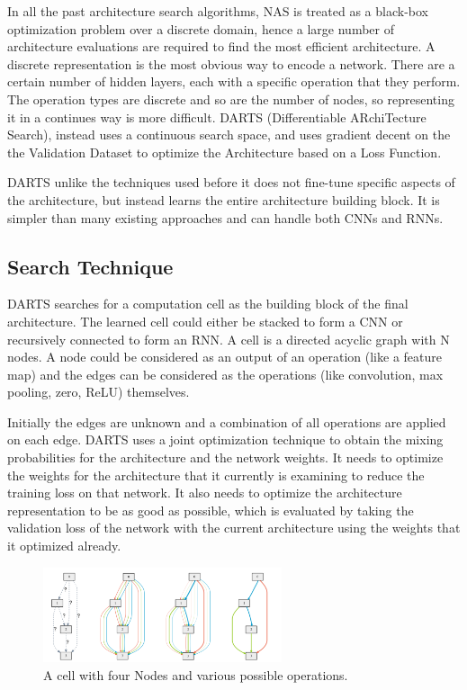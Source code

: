 \documentclass{ieee}
\begin{document}
In all the past architecture search algorithms, NAS is treated as a black-box optimization problem over a discrete domain, hence a large number of architecture evaluations are required to find the most efficient architecture. A discrete representation is the most obvious way to encode a network. There are a certain number of hidden layers, each with a specific operation that they perform. The operation types are discrete and so are the number of nodes, so representing it in a continues way is more difficult. DARTS (Differentiable ARchiTecture Search), instead uses a continuous search space, and uses gradient decent on the the Validation Dataset to optimize the Architecture based on a Loss Function.

DARTS unlike the techniques used before it does not fine-tune specific aspects of the architecture, but instead learns the entire architecture building block.  It is simpler than many existing approaches and can handle both CNNs and RNNs.

\subsection{Search Technique}
DARTS searches for a computation cell as the building block of the final architecture. The learned cell could either be stacked to form a CNN or recursively connected to form an RNN. A cell is a directed acyclic graph with N nodes. A node could be considered as an output of an operation (like a feature map) and the edges can be considered as the operations (like convolution, max pooling, zero, ReLU) themselves. 

Initially the edges are unknown and a combination of all operations are applied on each edge. DARTS uses a joint optimization technique to obtain the mixing probabilities for the architecture and the network weights. It needs to optimize the weights for the architecture that it currently is examining to reduce the training loss on that network. It also needs to optimize the architecture representation to be as good as possible, which is evaluated by taking the validation loss of the network with the current architecture using the weights that it optimized already. 
 \begin{figure}[h]
    \begin{center}
    \includegraphics[width=7cm]{images/DARTS.png}
    \end{center}
    \label{mbconv_fig}
    \caption{A cell with four Nodes and various possible operations. \cite{DARTSMODEL}}
\end{figure}
\end{document}
